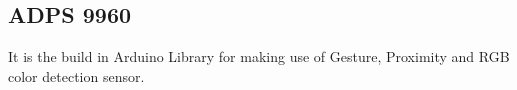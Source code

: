 \subsection{ADPS 9960}
It is the build in Arduino Library for making use of Gesture, Proximity and RGB color detection sensor.



%
%	
